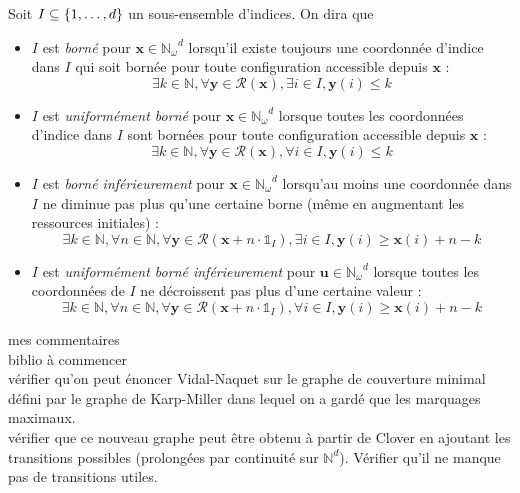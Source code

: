 \documentclass[a4paper,final]{article}
\theoremstyle{definition}
\let\leq\leqslant
\let\geq\geqslant
\newcommand{\os}[1]{\left\{\mathinner{#1}\right\}}
\newcommand{\N}{\ensuremath{\mathbb{N}}}
\newcommand{\Nomega}{\ensuremath{\mathbb{N}_\omega}}
\newcommand{\indicatrice}[1]{\ensuremath{\mathds{1}_{#1}}}
\newcommand{\vect}[1]{\ensuremath{\mathbf{#1}}}
\newcommand{\conf}[1]{\ensuremath{\mathcal{R}(#1)}}
\begin{document}
Soit $I\subseteq \os{1,\dots,d}$ un sous-ensemble d'indices.
On dira que
\begin{itemize}
    \item $I$ est \emph{borné} pour $\vect{x}\in \Nomega^d$ lorsqu'il existe toujours une coordonnée d'indice dans $I$ qui soit bornée pour toute configuration accessible depuis $\vect{x}$ :
    $$\exists k\in\N, \forall \vect{y}\in\conf{\vect{x}}, \exists i\in I, \vect{y}(i)\leq k$$
    
    \item $I$ est \emph{uniformément borné} pour $\vect{x}\in \Nomega^d$ lorsque toutes les coordonnées d'indice dans $I$ sont bornées pour toute configuration accessible depuis $\vect{x}$ :
    $$\exists k\in\N, \forall \vect{y}\in\conf{\vect{x}}, \forall i\in I, \vect{y}(i)\leq k$$
    
    \item $I$ est \emph{borné inférieurement} pour $\vect{x}\in \Nomega^d$ lorsqu'au moins une coordonnée dans $I$ ne diminue pas plus qu'une certaine borne (même en augmentant les ressources initiales) :
    $$\exists k\in\N, \forall n\in\N, \forall \vect{y}\in\conf{\vect{x} + n\cdot\indicatrice{I}}, \exists i\in I, \vect{y}(i)\geq \vect{x}(i)+n-k$$
    
    \item $I$ est \emph{uniformément borné inférieurement} pour $\vect{u}\in \Nomega^d$ lorsque toutes les coordonnées de $I$ ne décroissent pas plus d'une certaine valeur :
    $$\exists k\in\N, \forall n\in\N, \forall \vect{y}\in\conf{\vect{x} + n\cdot\indicatrice{I}}, \forall i\in I, \vect{y}(i)\geq \vect{x}(i)+n-k$$
\end{itemize}

mes commentaires \\
biblio à commencer\\
vérifier qu'on peut énoncer Vidal-Naquet sur le graphe de couverture minimal défini par le graphe de Karp-Miller dans lequel on a gardé que les marquages maximaux.\\
vérifier que ce nouveau graphe peut être obtenu à partir de Clover en ajoutant les transitions possibles (prolongées par continuité sur $\N^d$). Vérifier qu'il ne manque pas de transitions utiles.
\end{document}
